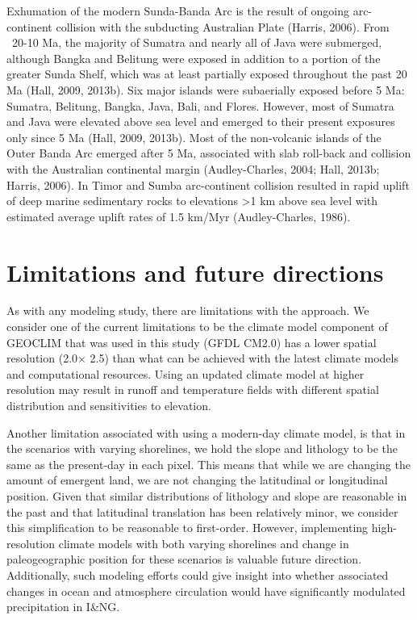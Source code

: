 \documentclass[11pt,letterpaper]{article}
\newcommand{\degrees}{\textdegree\xspace}
\begin{document}
Exhumation of the modern Sunda-Banda Arc is the result of ongoing arc-continent collision with the subducting Australian Plate (Harris, 2006). From ~20-10 Ma, the majority of Sumatra and nearly all of Java were submerged, although Bangka and Belitung were exposed in addition to a portion of the greater Sunda Shelf, which was at least partially exposed throughout the past 20 Ma (Hall, 2009, 2013b). Six major islands were subaerially exposed before 5 Ma: Sumatra, Belitung, Bangka, Java, Bali, and Flores. However, most of Sumatra and Java were elevated above sea level and emerged to their present exposures only since 5 Ma (Hall, 2009, 2013b). Most of the non-volcanic islands of the Outer Banda Arc emerged after 5 Ma, associated with slab roll-back and collision with the Australian continental margin (Audley-Charles, 2004; Hall, 2013b; Harris, 2006). In Timor and Sumba arc-continent collision resulted in rapid uplift of deep marine sedimentary rocks to elevations >1 km above sea level with estimated average uplift rates of 1.5 km/Myr (Audley-Charles, 1986).

\section*{Limitations and future directions}

As with any modeling study, there are limitations with the approach. We consider one of the current limitations to be the climate model component of GEOCLIM that was used in this study (GFDL CM2.0) has a lower spatial resolution (2.0\degrees $\times$ 2.5\degrees) than what can be achieved with the latest climate models and computational resources. Using an updated climate model at higher resolution may result in runoff and temperature fields with different spatial distribution and sensitivities to elevation. 

Another limitation associated with using a modern-day climate model, is that in the scenarios with varying shorelines, we hold the slope and lithology to be the same as the present-day in each pixel. This means that while we are changing the amount of emergent land, we are not changing the latitudinal or longitudinal position. Given that similar distributions of lithology and slope are reasonable in the past and that latitudinal translation has been relatively minor, we consider this simplification to be reasonable to first-order. However, implementing high-resolution climate models with both varying shorelines and change in paleogeographic position for these scenarios is valuable future direction. Additionally, such modeling efforts could give insight into whether associated changes in ocean and atmosphere circulation would have significantly modulated precipitation in I\&NG.  
\end{document}
